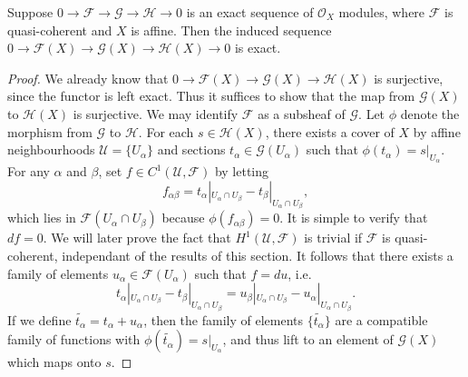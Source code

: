 \begin{theorem}
    Suppose $0 \to \mathcal{F} \to \mathcal{G} \to \mathcal{H} \to 0$ is an exact sequence of $\mathcal{O}_X$ modules, where $\mathcal{F}$ is quasi-coherent and $X$ is affine. Then the induced sequence $0 \to \mathcal{F}(X) \to \mathcal{G}(X) \to \mathcal{H}(X) \to 0$ is exact.
\end{theorem}
\begin{proof}
    We already know that $0 \to \mathcal{F}(X) \to \mathcal{G}(X) \to \mathcal{H}(X)$ is surjective, since the functor is left exact. Thus it suffices to show that the map from $\mathcal{G}(X)$ to $\mathcal{H}(X)$ is surjective. We may identify $\mathcal{F}$ as a subsheaf of $\mathcal{G}$. Let $\phi$ denote the morphism from $\mathcal{G}$ to $\mathcal{H}$. For each $s \in \mathcal{H}(X)$, there exists a cover of $X$ by affine neighbourhoods $\mathcal{U} = \{ U_\alpha \}$ and sections $t_\alpha \in \mathcal{G}(U_\alpha)$ such that $\phi(t_\alpha) = s|_{U_\alpha}$. For any $\alpha$ and $\beta$, set $f \in C^1(\mathcal{U},\mathcal{F})$ by letting
    \[ f_{\alpha \beta} = t_\alpha|_{U_\alpha \cap U_\beta} - t_\beta|_{U_\alpha \cap U_\beta}, \]
    which lies in $\mathcal{F}(U_\alpha \cap U_\beta)$ because $\phi(f_{\alpha \beta}) = 0$. It is simple to verify that $df = 0$. We will later prove the fact that $H^1(\mathcal{U},\mathcal{F})$ is trivial if $\mathcal{F}$ is quasi-coherent, independant of the results of this section. It follows that there exists a family of elements $u_\alpha \in \mathcal{F}(U_\alpha)$ such that $f = du$, i.e.
    \[ t_\alpha|_{U_\alpha \cap U_\beta} - t_\beta|_{U_\alpha \cap U_\beta} = u_\beta|_{U_\alpha \cap U_\beta} - u_\alpha|_{U_\alpha \cap U_\beta}. \]
    If we define $\tilde{t_\alpha} = t_\alpha + u_\alpha$, then the family of elements $\{ \tilde{t_\alpha} \}$ are a compatible family of functions with $\phi(\tilde{t_\alpha}) = s|_{U_\alpha}$, and thus lift to an element of $\mathcal{G}(X)$ which maps onto $s$.
\end{proof}

